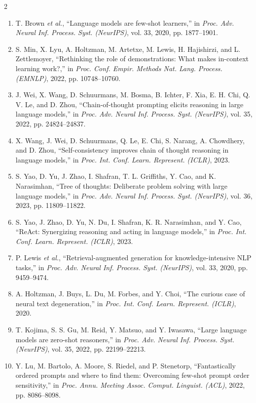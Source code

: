 \documentclass{article}
\begin{document}
\begin{multicols}{2}
\begin{enumerate}
\item[] [1] T. Brown \textit{et al.}, ``Language models are few-shot learners,'' in \textit{Proc. Adv. Neural Inf. Process. Syst. (NeurIPS)}, vol. 33, 2020, pp. 1877--1901.
\item[] [2] S. Min, X. Lyu, A. Holtzman, M. Artetxe, M. Lewis, H. Hajishirzi, and L. Zettlemoyer, ``Rethinking the role of demonstrations: What makes in-context learning work?,'' in \textit{Proc. Conf. Empir. Methods Nat. Lang. Process. (EMNLP)}, 2022, pp. 10748--10760.
\item[] [3] J. Wei, X. Wang, D. Schuurmans, M. Bosma, B. Ichter, F. Xia, E. H. Chi, Q. V. Le, and D. Zhou, ``Chain-of-thought prompting elicits reasoning in large language models,'' in \textit{Proc. Adv. Neural Inf. Process. Syst. (NeurIPS)}, vol. 35, 2022, pp. 24824--24837.
\item[] [4] X. Wang, J. Wei, D. Schuurmans, Q. Le, E. Chi, S. Narang, A. Chowdhery, and D. Zhou, ``Self-consistency improves chain of thought reasoning in language models,'' in \textit{Proc. Int. Conf. Learn. Represent. (ICLR)}, 2023.
\item[] [5] S. Yao, D. Yu, J. Zhao, I. Shafran, T. L. Griffiths, Y. Cao, and K. Narasimhan, ``Tree of thoughts: Deliberate problem solving with large language models,'' in \textit{Proc. Adv. Neural Inf. Process. Syst. (NeurIPS)}, vol. 36, 2023, pp. 11809--11822.
\item[] [6] S. Yao, J. Zhao, D. Yu, N. Du, I. Shafran, K. R. Narasimhan, and Y. Cao, ``ReAct: Synergizing reasoning and acting in language models,'' in \textit{Proc. Int. Conf. Learn. Represent. (ICLR)}, 2023.
\item[] [7] P. Lewis \textit{et al.}, ``Retrieval-augmented generation for knowledge-intensive NLP tasks,'' in \textit{Proc. Adv. Neural Inf. Process. Syst. (NeurIPS)}, vol. 33, 2020, pp. 9459--9474.
\item[] [8] A. Holtzman, J. Buys, L. Du, M. Forbes, and Y. Choi, ``The curious case of neural text degeneration,'' in \textit{Proc. Int. Conf. Learn. Represent. (ICLR)}, 2020.
\item[] [9] T. Kojima, S. S. Gu, M. Reid, Y. Matsuo, and Y. Iwasawa, ``Large language models are zero-shot reasoners,'' in \textit{Proc. Adv. Neural Inf. Process. Syst. (NeurIPS)}, vol. 35, 2022, pp. 22199--22213.
\item[] [10] Y. Lu, M. Bartolo, A. Moore, S. Riedel, and P. Stenetorp, ``Fantastically ordered prompts and where to find them: Overcoming few-shot prompt order sensitivity,'' in \textit{Proc. Annu. Meeting Assoc. Comput. Linguist. (ACL)}, 2022, pp. 8086--8098.

\end{enumerate}
\end{multicols}
\end{document}
